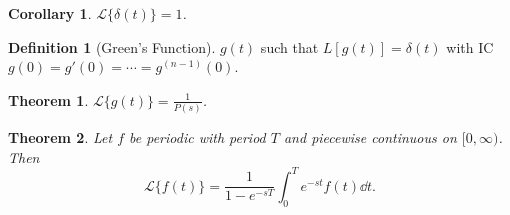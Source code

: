 \documentclass[12pt, oneside]{article}
\newcommand{\laplace}[1]{\mathcal{L}\{#1\}}
\theoremstyle{definition}
\newtheorem{defn}{Definition}
\theoremstyle{plain}
\newtheorem{thm}{Theorem}
\newtheorem{cor}{Corollary}
\theoremstyle{remark}
\begin{document}
\begin{cor}
  $\laplace{\delta(t)} = 1$.
\end{cor}
\begin{defn}[Green's Function]
  $g(t)$ such that $L[g(t)] = \delta(t)$ with IC $g(0) = g'(0) = \cdots=  g^{(n-1)}(0)$.
\end{defn}
\begin{thm}
  $\laplace{g(t)} = \frac{1}{P(s)}$.
\end{thm}

\begin{thm}
  Let $f$ be periodic with period $T$ and piecewise continuous on $[0, \infty)$. Then \[
  \laplace{f(t)}   = \frac{1}{1 - e^{-sT}}\int_0^T e^{-st} f(t) \dd{t}.
  \]
\end{thm}
\end{document}
